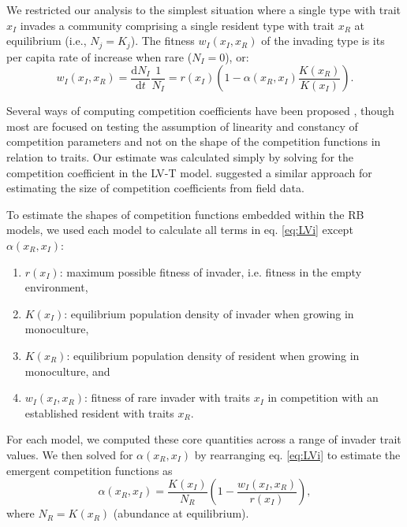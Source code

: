 \documentclass[a4paper,11pt]{article}
\newcommand{\ud}{\ensuremath{\mathrm{d}}}
\begin{document}
We restricted our analysis to the simplest situation where a single type with trait $x_I$ invades a community comprising a single resident type with trait $x_R$ at equilibrium (i.e., $N_j = K_j$). The fitness $w_I(x_I, x_R)$ of the invading type is its per capita rate of increase when rare ($N_I = 0$), or:
\begin{equation}\label{eq:LVi}
 w_I(x_I, x_R) = \frac{\ud N_I}{\ud t} \frac{1}{N_I} =
 r(x_I)\left(1 - \alpha(x_R, x_I) \frac{K(x_R)}{K(x_I)}\right).
\end{equation}

Several ways of computing competition coefficients have been proposed \citep[e.g.,][]{Abrams-1987,Abrams-2008}, though most are focused on testing the assumption of linearity and constancy of competition parameters and not on the shape of the competition functions in relation to traits. Our estimate was calculated simply by solving for the competition coefficient in the LV-T model. \citet{Ricklefs-1973} suggested a similar approach for estimating the size of competition coefficients from field data.

To estimate the shapes of competition functions embedded within the RB models, we used each model to calculate all terms in eq. \ref{eq:LVi} except $\alpha(x_R, x_I)$:
\begin{enumerate}
\item $r(x_I)$: maximum possible fitness of invader, i.e. fitness in the empty environment,
\item $K(x_I)$: equilibrium population density of invader when growing in monoculture,
\item $K(x_R)$: equilibrium population density of resident when growing in monoculture, and
\item $w_I(x_I, x_R)$: fitness of rare invader with traits $x_I$ in competition with an established resident with traits $x_R$.
\end{enumerate}

For each model, we computed these core quantities across a range of invader trait values. We then solved for $\alpha(x_R, x_I)$ by rearranging eq. \ref{eq:LVi} to estimate the emergent competition functions as
\begin{equation} \label{eq:alpha}
 \alpha(x_R, x_I) = \frac{K(x_I)}{N_R} \left(1 - \frac{w_I(x_I, x_R)}{r(x_I)}\right),
\end{equation}
where $N_R = K(x_R)$ (abundance at equilibrium). 
\end{document}
